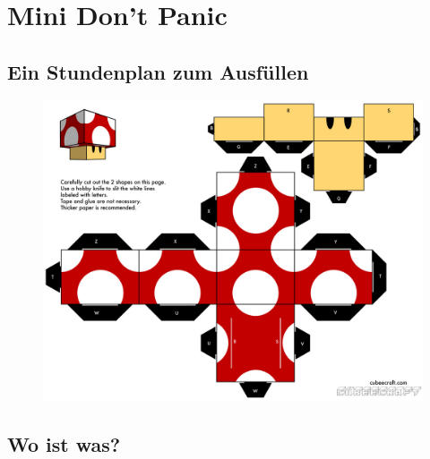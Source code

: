\documentclass[12pt,a4paper]{scrartcl}
\begin{document}
\newpage
\section{Mini Don't Panic}
\subsection*{Ein Stundenplan zum Ausfüllen}

\newpage

\begin{figure}
    \centering
    \includegraphics[scale=1]{bilder/Cubeecraft_Mushroom_Super_mario.jpg}
\end{figure}


\newpage

\subsection*{Wo ist was?}
    
    \clearpage
\end{document}

